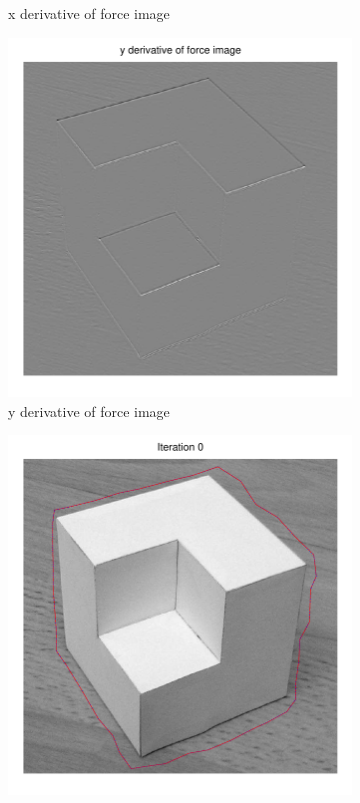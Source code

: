 \documentclass[11pt,a4paper]{article}
\begin{document}
\begin{figure}[H]
\begin{subfigure}[t]{0.24\textwidth}
        \caption{x derivative of force image}
        \label{fig:cubic_log_fx}
    \end{subfigure}
    \begin{subfigure}[t]{0.24\textwidth}
        \includegraphics[width=\textwidth]{src/images/cubic_log_yforces.pdf}
        \caption{y derivative of force image}
        \label{fig:cubic_log_fy}
    \end{subfigure}
    \begin{subfigure}[t]{0.24\textwidth}
        \includegraphics[width=\textwidth]{src/images/cubic_log_0.pdf}

\end{subfigure}
\end{figure}
\end{document}
